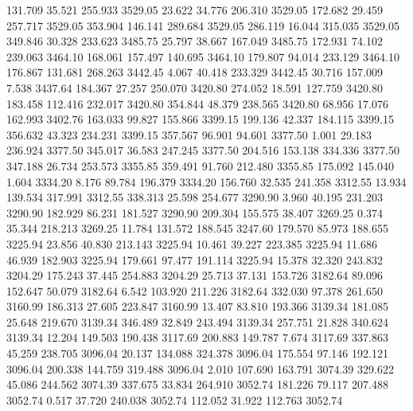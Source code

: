  131.709   35.521  255.933      3529.05
  23.622   34.776  206.310      3529.05
 172.682   29.459  257.717      3529.05
 353.904  146.141  289.684      3529.05
 286.119   16.044  315.035      3529.05
 349.846   30.328  233.623      3485.75
  25.797   38.667  167.049      3485.75
 172.931   74.102  239.063      3464.10
 168.061  157.497  140.695      3464.10
 179.807   94.014  233.129      3464.10
 176.867  131.681  268.263      3442.45
   4.067   40.418  233.329      3442.45
  30.716  157.009    7.538      3437.64
 184.367   27.257  250.070      3420.80
 274.052   18.591  127.759      3420.80
 183.458  112.416  232.017      3420.80
 354.844   48.379  238.565      3420.80
  68.956   17.076  162.993      3402.76
 163.033   99.827  155.866      3399.15
 199.136   42.337  184.115      3399.15
 356.632   43.323  234.231      3399.15
 357.567   96.901   94.601      3377.50
   1.001   29.183  236.924      3377.50
 345.017   36.583  247.245      3377.50
 204.516  153.138  334.336      3377.50
 347.188   26.734  253.573      3355.85
 359.491   91.760  212.480      3355.85
 175.092  145.040    1.604      3334.20
   8.176   89.784  196.379      3334.20
 156.760   32.535  241.358      3312.55
  13.934  139.534  317.991      3312.55
 338.313   25.598  254.677      3290.90
   3.960   40.195  231.203      3290.90
 182.929   86.231  181.527      3290.90
 209.304  155.575   38.407      3269.25
   0.374   35.344  218.213      3269.25
  11.784  131.572  188.545      3247.60
 179.570   85.973  188.655      3225.94
  23.856   40.830  213.143      3225.94
  10.461   39.227  223.385      3225.94
  11.686   46.939  182.903      3225.94
 179.661   97.477  191.114      3225.94
  15.378   32.320  243.832      3204.29
 175.243   37.445  254.883      3204.29
  25.713   37.131  153.726      3182.64
  89.096  152.647   50.079      3182.64
   6.542  103.920  211.226      3182.64
 332.030   97.378  261.650      3160.99
 186.313   27.605  223.847      3160.99
  13.407   83.810  193.366      3139.34
 181.085   25.648  219.670      3139.34
 346.489   32.849  243.494      3139.34
 257.751   21.828  340.624      3139.34
  12.204  149.503  190.438      3117.69
 200.883  149.787    7.674      3117.69
 337.863   45.259  238.705      3096.04
  20.137  134.088  324.378      3096.04
 175.554   97.146  192.121      3096.04
 200.338  144.759  319.488      3096.04
   2.010  107.690  163.791      3074.39
 329.622   45.086  244.562      3074.39
 337.675   33.834  264.910      3052.74
 181.226   79.117  207.488      3052.74
   0.517   37.720  240.038      3052.74
 112.052   31.922  112.763      3052.74
